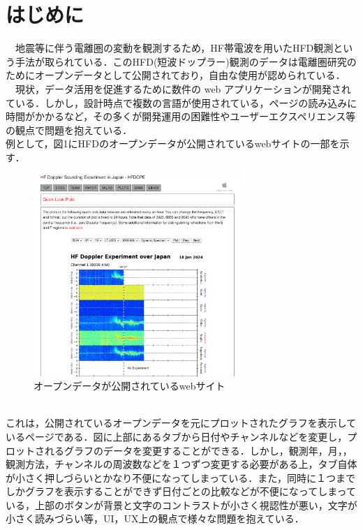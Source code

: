 \section{はじめに}

　地震等に伴う電離圏の変動を観測するため，HF帯電波を用いたHFD観測という手法が取られている．このHFD(短波ドップラー)観測のデータは電離圏研究のためにオープンデータとして公開されており，自由な使用が認められている．\cite{hfd_report}\\
　現状，データ活用を促進するために数件の web アプリケーションが開発されている．しかし，設計時点で複数の言語が使用されている，ページの読み込みに時間がかかるなど，その多くが開発運用の困難性やユーザーエクスペリエンス等の観点で問題を抱えている．\\
 例として，図1にHFDのオープンデータが公開されているwebサイトの一部を示す．\cite{hfd_link}\\
 \begin{figure}[h]
   \centering
   \includegraphics[width=80mm]{fig/websc.png}
   \caption{オープンデータが公開されているwebサイト}
 \end{figure}\\
 これは，公開されているオープンデータを元にプロットされたグラフを表示しているページである．図に上部にあるタブから日付やチャンネルなどを変更し，プロットされるグラフのデータを変更することができる．しかし，観測年，月，，観測方法，チャンネルの周波数などを１つずつ変更する必要がある上，タブ自体が小さく押しづらいとかなり不便になってしまっている．また，同時に１つまでしかグラフを表示することができず日付ごとの比較などが不便になってしまっている，上部のボタンが背景と文字のコントラストが小さく視認性が悪い，文字が小さく読みづらい等，UI，UX上の観点で様々な問題を抱えている．\\
